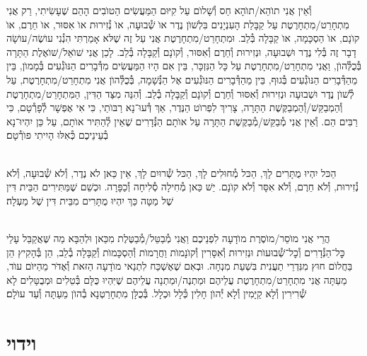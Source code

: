 \documentclass[twoside, openany, parskip=half, 11pt]{book}
\begin{document}
וְ֯אֵין אֲנִי תוׂהֵא/תוׂהָא חַס וְ֯שָׁלוׂם עַל קִיּוּם הַמַּעֲשִׂים הַטוׂבִים הָהֵם שֶׁעָשִׂיתִי, רַק אֲנִי מִתְחָרֵט/מִתְחָרֶטֶת עַל קַבָּלַת הָעִנְיָנִים בִּלְשׁוׂן נֶדֶר אוׂ שְׁ֯בוּעָה, אוׂ נְ֯זִירוּת אוׂ אִסּוּר, אוׂ חֵרֶם, אוׂ קוׂנָם, אוׂ הַסְכָּמָה, אוׂ קַבָּלָה בְּ֯לֵב. וּמִתְחָרֵט/מִתְחָרֶטֶת אֲנִי עַל זֶה שֶׁלּא אָמַרְתִּי הִנְ֯נִי עוׂשֶׂה/עוׂשָׂה דָבָר זֶה בְּ֯לִי נֶדֶר וּשְׁבוּעָה, וּנְזִירוּת וְ֯חֵרֶם וְ֯אִסּוּר, וְ֯קוׂנָם וְ֯קַבָּלָה בְּ֯לֵב. לָכֵן אֲנִי שׁוׂאֵל/שׁוׂאֶלֶת הַתָּרָה בְּ֯כֻלְּ֯הוׂן, וַאֲנִי מִתְחָרֵט/מִתְחָרֶטֶת עַל כָּל הַנִּזְכָּר, בֵּין אִם הָיוּ הַמַּעֲשִׂים מִדְּ֯בָרִים הַנּוׂגְ֯עִים בְּ֯מָמוׂן, בֵּין מֵהַדְּ֯בָרִים הַנּוׂגְ֯עִים בְּ֯גוּף, בֵּין מֵהַדְּ֯בָרִים הַנּוׂגְ֯עִים אֶל הַנְּ֯שָׁמָה, בְּ֯כֻלְּ֯הוׂן אֲנִי מִתְחָרֵט/מִתְחָרֶטֶת, עַל לְ֯שׁוׂן נֶדֶר וּשְׁבוּעָה וּנְזִירוּת וְ֯אִסּוּר וְ֯חֵרֶם וְ֯קוׂנָם וְ֯קַבָּלָה בְ֯לֵב. וְ֯הִנֵּה מִצַּד הַדִּין, הַמִּתְחָרֵט/מִתְחָרֶטֶת וְ֯הַמְבַקֵּשׁ/וְ֯הַמְבַקֶּשֶׁת הַתָּרָה, צָרִיךְ לִפְרוׂט הַנֶּדֶר, אַךְ דְּ֯עוּ־נָא רַבּוׂתַי, כִּי אִי אֶפְשָׁר לְ֯פָרְ֯טָם, כִּי רַבִּים הֵם. וְ֯אֵין אֲנִי מְ֯בַקֵּשׁ/מְ֯בַקֶּשֶׁת הַתָּרָה עַל אוׂתָם הַנְּ֯דָרִים שֶׁאֵין לְ֯הַתִּיר אוׂתָם, עַל כֵּן יִהְיוּ־נָא בְ֯עֵינֵיכֶם כְּ֯אִלּוּ הָיִיתִי פוׂרְ֯טָם׃

\\
הַכּל יִהְיוּ מֻתָּרִים לָךְ, הַכּל מְ֯חוּלִים לָךְ, הַכּל שְׁ֯רוּיִם לָךְ, אֵין כַּאן לֺא נֶדֶר, וְ֯לֺא שְׁ֯בוּעָה, וְ֯לֺא נְ֯זִירוּת, וְ֯לֺא חֵרֶם, וְ֯לֺא אִסָּר וְ֯לֺא קוׂנָם. יֵשׁ כַּאן מְ֯חִילָה סְ֯לִיחָה וְ֯כַפָּרָה. וּכְשֵׁם שֶׁמַּתִּירִים הַבֵּית דִּין שֶׁל מַטָּה כַּךְ יִהְיוּ מֻתָּרִים מִבֵּית דִּין שֶׁל מַעְלָה׃

\\
הֲרֵי אֲנִי מוֺסֵר/מוֺסֶרֶת מוׂדָעָה לִפְנֵיכֶם וַאֲנִי מְ֯בַטֵּל/מְ֯בַטֶּלֶת מִכַּאן וּלְהַבָּא מַה שֶּׁאֲקַבֵּל עָלַי כׇּל־הַנְּ֯דָרִים וְ֯כׇל־שְׁ֯בוּעוׂת וּנְזִירוּת וְ֯אִסָּרִין וְ֯קוׂנָמוׂת וַחֲרָמוׂת וְ֯הַסְכָּמוׂת וְ֯קַבָּלָה בְ֯לֵב, הֵן בְּ֯הָקִיץ הֵן בַּחֲלוׂם חוּץ מִנִּדְרֵי תַעֲנִית בִּשְׁעַת מִנְחָה. וּבְאִם שֶׁאֶשְׁכַּח לִתְנַאי מוׂדָעָה הַזּאת וְ֯אֶדּׂר מֵהַיּוׂם עוׂד, מֵעַתָּה אֲנִי מִתְחָרֵט/מִתְחָרֶטֶת עֲלֵיהֶם וּמַתְנֶה/וּמַתְנָה עֲלֵיהֶם שֶׁיִּהְיוּ כֻּלָּם בְּ֯טֵלִים וּמְבֻטָּלִים לָא שְׁ֯רִירִין וְ֯לָא קַיָּמִין וְ֯לָא יְ֯הוׂן חָלִין כְּ֯לָל וּכְלָל. בְּ֯כֻלָּן מִתְחָרַטְנָא בְ֯הוׂן מֵעַתָּה וְ֯עַד עוׂלָם׃

\vfill
\sepline




\chapter[וידוי]{ וידוי }
\end{document}
